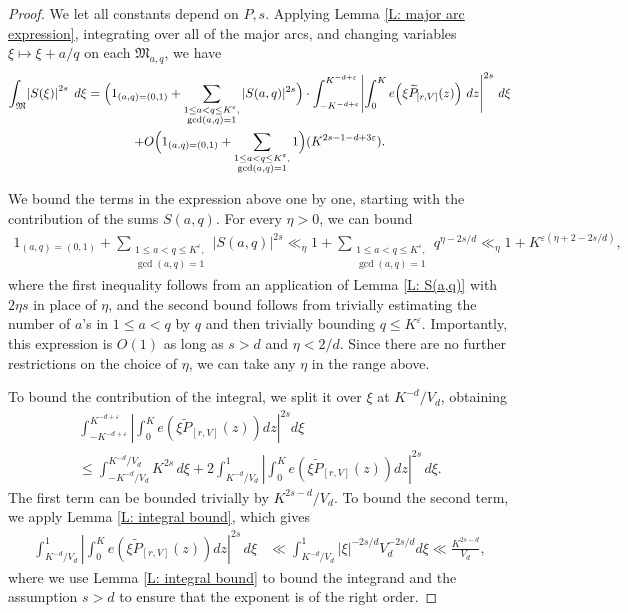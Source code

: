 \documentclass[11pt]{amsart}
\theoremstyle{definition}
\newcommand{\veps}{\varepsilon}
\newcommand{\abs}[1]{\mathopen{}\left| #1\mathclose{}\right|}
\newcommand{\brac}[1]{\mathopen{}\left( #1 \mathclose{}\right)}
\newcommand{\Bigbrac}[1]{\Bigl( #1 \Bigr)}
\begin{document}
\begin{proof}
We let all constants depend on $P, s$.
Applying Lemma \ref{L: major arc expression}, integrating over all of the major arcs, and changing variables $\xi\mapsto \xi + a/q$ on each $\mathfrak{M}_{a,q}$, we have  
\begin{multline*}
    \int_\mathfrak{M}\abs{S(\xi)}^{2s}\; d\xi = \Bigbrac{1_{(a,q)=(0,1)} + \sum_{\substack{1\leq a < q\leq K^\veps,\\ \gcd(a,q) = 1}}
    |S(a,q)|^{2s}}\cdot\int_{-K^{-d+\veps}}^{K^{-d+\veps}} \abs{\int_0^K e\brac{{\xi}\widetilde{P}_{[r, V]}(z)} \,dz}^{2s}\, d\xi\\
    +O\Bigbrac{1_{(a,q)=(0,1)} + \sum_{\substack{1\leq a < q\leq K^\veps,\\ \gcd(a,q) = 1}}1}(K^{2s-1-d+3\veps}).
\end{multline*}

We bound the terms in the expression above one by one, starting with  the contribution of the sums $S(a,q)$. For every $\eta>0$, we can bound
\begin{align*}
    1_{(a,q)=(0,1)} + \sum_{\substack{1\leq a < q\leq K^\veps,\\ \gcd(a,q) = 1}}|S(a,q)|^{2s}\ll_{\eta} 1 +  \sum_{\substack{1\leq a < q\leq K^\veps,\\ \gcd(a,q) = 1}}q^{\eta -2s/d}\ll_\eta 1 + K^{\veps(\eta + 2-2s/d)},
\end{align*}
where the first inequality follows from an application of Lemma \ref{L: S(a,q)} with $2\eta s$ in place of $\eta$, and the second bound follows from trivially estimating the number of $a$'s in $1\leq a < q$ by $q$ and then trivially bounding $q\leq K^\veps$. 
Importantly, this expression is $O(1)$ as long as $s>d$ and $\eta<2/d$. Since there are no further restrictions on the choice of $\eta$, we can take any $\eta$ in the range above. 

To bound the contribution of the integral, we split it over $\xi$ at $K^{-d}/V_d$, obtaining
\begin{multline*}
    \int_{-K^{-d+\veps}}^{K^{-d+\veps}} \abs{\int_0^K e\brac{\xi \widetilde{P}_{[r, V]}(z)}dz}^{2s} d\xi\\ \leq \int_{-K^{-d}/V_d}^{K^{-d}/V_d} K^{2s}\, d\xi + 2 \int_{K^{-d}/V_d}^1 \abs{\int_0^K e\brac{\xi \widetilde{P}_{[r, V]}(z)}dz}^{2s}\, d\xi.
\end{multline*}
The first term can be bounded trivially by $K^{2s-d}/V_d$. To bound the second term, we apply Lemma \ref{L: integral bound}, which gives
\begin{align*}
    \int_{K^{-d}/V_d}^1 \abs{\int_0^K e\brac{\xi \widetilde{P}_{[r, V]}(z)}dz}^{2s}\, d\xi
    &\ll \int_{K^{-d}/V_d}^1 |\xi|^{-2s/d}V_d^{-2 s/d} d\xi\ll  \frac{K^{2s-d}}{V_d},
\end{align*}
where we use Lemma \ref{L: integral bound} to bound the integrand and the assumption $s>d$ to ensure that the exponent is of the right order. 


\end{proof}
\end{document}
